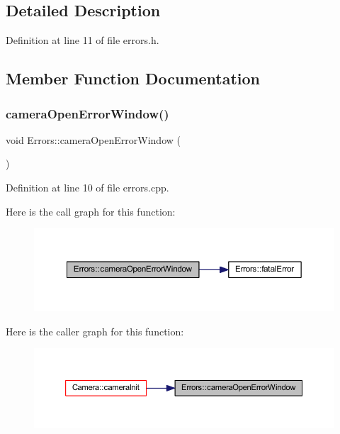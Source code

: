 \subsection{Detailed Description}


Definition at line 11 of file errors.\+h.



\subsection{Member Function Documentation}
\mbox{\label{classErrors_ac17ec34c73179504a0ba63271a005d0a}} 
\subsubsection{\texorpdfstring{cameraOpenErrorWindow()}{cameraOpenErrorWindow()}}
{\footnotesize\ttfamily void Errors\+::camera\+Open\+Error\+Window (\begin{DoxyParamCaption}{ }\end{DoxyParamCaption})\hspace{0.3cm}{\ttfamily [static]}}



Definition at line 10 of file errors.\+cpp.

Here is the call graph for this function\+:
\nopagebreak
\begin{figure}[H]
\begin{center}
\leavevmode
\includegraphics[width=350pt]{classErrors_ac17ec34c73179504a0ba63271a005d0a_cgraph}
\end{center}
\end{figure}
Here is the caller graph for this function\+:
\nopagebreak
\begin{figure}[H]
\begin{center}
\leavevmode
\includegraphics[width=350pt]{classErrors_ac17ec34c73179504a0ba63271a005d0a_icgraph}
\end{center}
\end{figure}
\mbox{\label{classErrors_a988959b35354c727ebe2fd884ee34bae}} 
